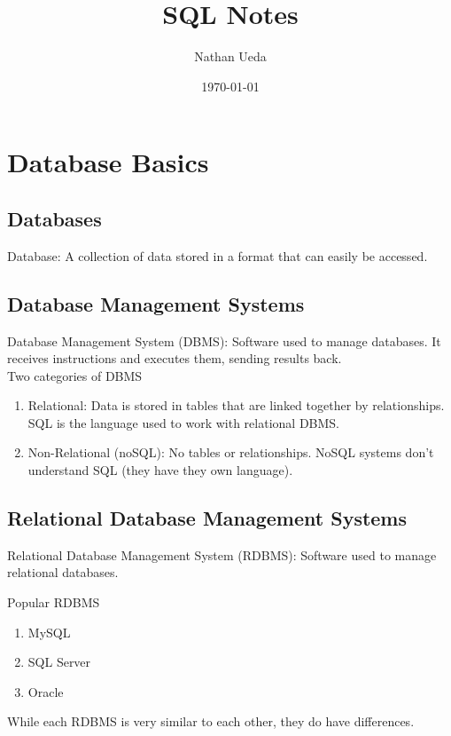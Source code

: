 \documentclass[11pt]{article}
\title{SQL Notes}
\author{Nathan Ueda}
\date{\today}
\begin{document}
\maketitle 
\pagebreak
\tableofcontents
\pagebreak

\section{Database Basics}
\subsection{Databases}
Database: A collection of data stored in a format that can easily be accessed.

\subsection{Database Management Systems}
Database Management System (DBMS): Software used to manage databases. It receives instructions
and executes them, sending results back. \\

Two categories of DBMS
\begin{enumerate}
    \item Relational: Data is stored in tables that are linked together by relationships. SQL
    is the language used to work with relational DBMS.
    \item Non-Relational (noSQL): No tables or relationships. NoSQL systems don't understand
    SQL (they have they own language).
\end{enumerate}

\subsection{Relational Database Management Systems}
Relational Database Management System (RDBMS): Software used to manage relational databases. 

Popular RDBMS
\begin{enumerate}
    \item MySQL
    \item SQL Server
    \item Oracle
\end{enumerate}

While each RDBMS is very similar to each other, they do have differences. 
\end{document}
